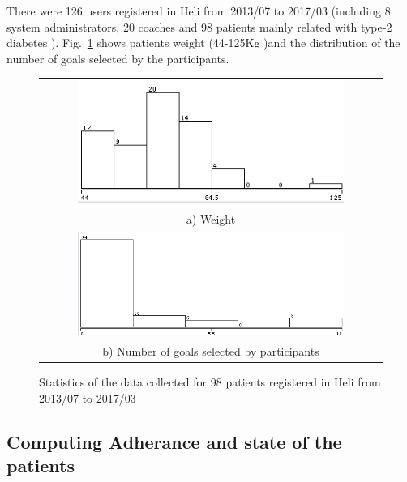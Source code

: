\documentclass[graybox]{svmult}
\begin{document}
There were 126 users registered in Heli from 2013/07 to 2017/03 (including 8 system administrators, 20 coaches and 98 patients mainly related with type-2 diabetes ). Fig.~\ref{Fig.Weight-Goals} shows patients weight (44-125Kg )and the distribution of the number of goals selected by the participants.
\vspace*{-\baselineskip}\begin{figure}[h]
  \begin{center}
  \begin{tabular}{c}
     \includegraphics[width=0.8\textwidth]{Weight.png}\\
          a) Weight\\
   \includegraphics[width=0.8\textwidth]{Goals.png}\\
 b) Number of goals selected by participants\\
    \end{tabular}
    \caption{Statistics of the data collected for 98 patients registered in Heli from 2013/07 to 2017/03}
     \label{Fig.Weight-Goals}
\end{center}
\end{figure} 

\subsection {Computing Adherance and state of the patients}
\label{sec.patient_states}
\end{document}
